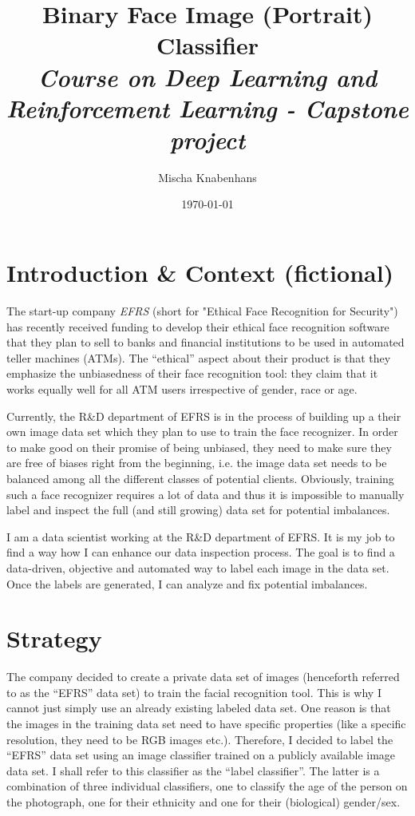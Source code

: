\documentclass{article}
\title{\Large{Binary Face Image (Portrait) Classifier} \\\doublespacing \large{\it{Course on Deep Learning and Reinforcement Learning - Capstone project}}}
\author{Mischa Knabenhans}
\date\today
\begin{document}
\maketitle %

\section{Introduction \& Context (fictional)}
The start-up company {\it EFRS} (short for "Ethical Face Recognition for Security") has recently received funding to develop their ethical face recognition software that they plan to sell to banks and financial institutions to be used in automated teller machines (ATMs). The ``ethical'' aspect about their product is that they emphasize the unbiasedness of their face recognition tool: they claim that it works equally well for all ATM users irrespective of gender, race or age.

Currently, the R\&D department of EFRS is in the process of building up a their own image data set which they plan to use to train the face recognizer. In order to make good on their promise of being unbiased, they need to make sure they are free of biases right from the beginning, i.e. the image data set needs to be balanced among all the different classes of potential clients. Obviously, training such a face recognizer requires a lot of data and thus it is impossible to manually label and inspect the full (and still growing) data set for potential imbalances.

I am a data scientist working at the R\&D department of EFRS. It is my job to find a way how I can enhance our data inspection process. The goal is to find a data-driven, objective and automated way to label each image in the data set. Once the labels are generated, I can analyze and fix potential imbalances.

\section{Strategy}
The company decided to create a private data set of images (henceforth referred to as the ``EFRS'' data set) to train the facial recognition tool. This is why I cannot just simply use an already existing labeled data set. One reason is that the images in the training data set need to have specific properties (like a specific resolution, they need to be RGB images etc.). Therefore, I decided to label the ``EFRS'' data set using an image classifier trained on a publicly available image data set. I shall refer to this classifier as the ``label classifier''. The latter is a combination of three individual classifiers, one to classify the age of the person on the photograph, one for their ethnicity and one for their (biological) gender/sex.
\end{document}

